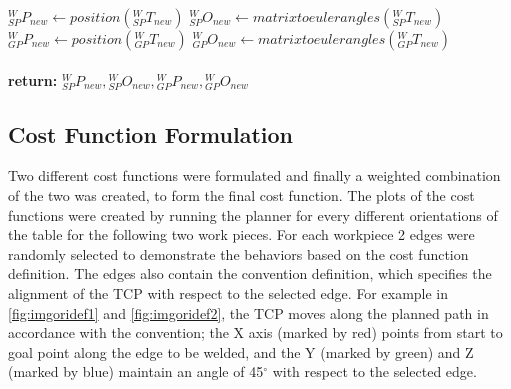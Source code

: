 \begin{algorithm}
\begin{algorithmic}[1]
		\State $\textit{$_{SP}^{W}P_{new}$} \gets position(\textit{$_{SP}^{W}T_{new}$})$
		\State $\textit{$_{SP}^{W}O_{new}$} \gets matrixtoeulerangles(\textit{$_{SP}^{W}T_{new}$})$
		\State $\textit{$_{GP}^{W}P_{new}$} \gets position(\textit{$_{GP}^{W}T_{new}$})$
		\State $\textit{$_{GP}^{W}O_{new}$} \gets matrixtoeulerangles(\textit{$_{GP}^{W}T_{new}$})$\\
		
		\EndFor \\
		\textbf{return:} $\textit{$_{SP}^{W}P_{new}$},\textit{$_{SP}^{W}O_{new}$},\textit{$_{GP}^{W}P_{new}$},\textit{$_{GP}^{W}O_{new}$}$
	\end{algorithmic}
\end{algorithm}
\newpage
\subsection{Cost Function Formulation}
\label{ssec:cst}
Two different cost functions were formulated and finally a weighted combination of the two was created, to form the final cost function. The plots of the cost functions were created by running the planner for every different orientations of the table for the following two work pieces. For each workpiece 2 edges were randomly selected to demonstrate the behaviors based on the cost function definition. The edges also contain the convention definition, which specifies the alignment of the TCP with respect to the selected edge. For example in \ref{fig:imgoridef1} and \ref{fig:imgoridef2}, the TCP moves along the planned path in accordance with the convention; the X axis (marked by red) points from start to goal point along the edge to be welded, and the Y (marked by green) and Z (marked by blue) maintain an angle of 45$^{\circ}$ with respect to the selected edge. \\
